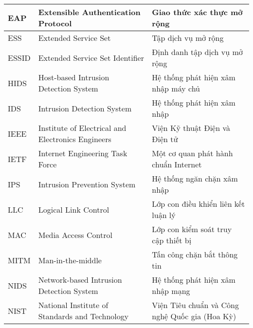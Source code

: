 \begin{table}[H]
\begin{tabular}{|l|p{6cm}|p{7cm}|}
EAP                               & Extensible Authentication Protocol                                      & Giao thức xác thực mở rộng                                   \\ \hline
ESS                               & Extended Service Set                                                    & Tập dịch vụ mở rộng                                          \\ \hline
ESSID                             & Extended Service Set Identifier                                         & Định danh tập dịch vụ mở rộng                                \\ \hline
HIDS                              & Host-based Intrusion Detection System                                   & Hệ thống phát hiện xâm nhập máy chủ                          \\ \hline
IDS                               & Intrusion Detection System                                              & Hệ thống phát hiện xâm nhập                                  \\ \hline
IEEE                              & Institute of Electrical and Electronics Engineers                       & Viện Kỹ thuật Điện và Điện tử                         \\ \hline
IETF                              & Internet Engineering Task Force                                         & Một cơ quan phát hành chuẩn Internet                         \\ \hline
IPS                               & Intrusion Prevention System                                             & Hệ thống ngăn chặn xâm nhập                                  \\ \hline
LLC                               & Logical Link Control                                                    & Lớp con điều khiển liên kết luận lý                          \\ \hline
MAC                               & Media Access Control                                                    & Lớp con kiểm soát truy cập thiết bị                          \\ \hline
MITM                              & Man-in-the-middle                                                       & Tấn công chặn bắt thông tin                                  \\ \hline
NIDS                              & Network-based Intrusion Detection System                                & Hệ thống phát hiện xâm nhập mạng                             \\ \hline
NIST                              & National Institute of Standards and Technology                          & Viện Tiêu chuẩn và Công nghệ Quốc gia (Hoa Kỳ)               \\ \hline
\end{tabular}
\end{table}

